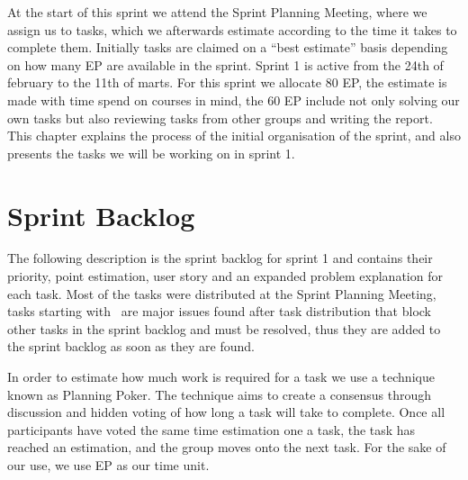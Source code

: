 At the start of this sprint we attend the Sprint Planning Meeting, where we assign us to tasks, which we afterwards estimate according to the time it takes to complete them.
Initially tasks are claimed on a ``best estimate'' basis depending on how many EP are available in the sprint.
Sprint 1 is active from the 24th of february to the 11th of marts. 
For this sprint we allocate 80 EP, the estimate is made with time spend on courses in mind, the 60 EP include not only solving our own tasks but also reviewing tasks from other groups and writing the report.
This chapter explains the process of the initial organisation of the sprint, and also presents the tasks we will be working on in sprint 1.

\section{Sprint Backlog}\label{plan1}
The following description is the sprint backlog for sprint 1 and contains their priority, point estimation, user story and an expanded problem explanation for each task.
Most of the tasks were distributed at the Sprint Planning Meeting, tasks starting with \pblocking~are major issues found after task distribution that block other tasks in the sprint backlog and must be resolved, thus they are added to the sprint backlog as soon as they are found.

In order to estimate how much work is required for a task we use a technique known as Planning Poker.
The technique aims to create a consensus through discussion and hidden voting of how long a task will take to complete.
Once all participants have voted the same time estimation one a task, the task has reached an estimation, and the group moves onto the next task.
For the sake of our use, we use EP as our time unit.

